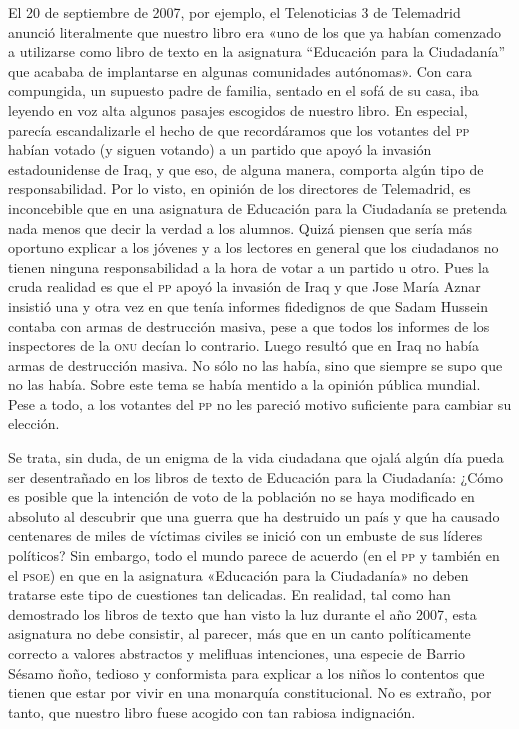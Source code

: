 \documentclass[draft,9pt,letterpaper,twocolumn,openany]{extbook}
\begin{document}
El 20 de septiembre de 2007, por ejemplo, el Telenoticias 3 de Telemadrid
anunció literalmente que nuestro libro era «uno de los que ya habían comenzado
a utilizarse como libro de texto en la asignatura “Educación para la Ciudadanía”
que acababa de implantarse en algunas comunidades autónomas». Con cara 
compungida, un supuesto padre de familia, sentado en el sofá de su casa, iba leyendo
 en voz alta algunos pasajes escogidos de nuestro libro. En especial, parecía 
 escandalizarle el hecho de que recordáramos que los votantes del \textsc{pp} habían votado
(y siguen votando) a un partido que apoyó la invasión estadounidense de Iraq, y
que eso, de alguna manera, comporta algún tipo de responsabilidad. Por lo visto,
en opinión de los directores de Telemadrid, es inconcebible que en una asignatura
 de Educación para la Ciudadanía se pretenda nada menos que decir la verdad
a los alumnos. Quizá piensen que sería más oportuno explicar a los jóvenes y a
los lectores en general que los ciudadanos no tienen ninguna responsabilidad a la
hora de votar a un partido u otro. Pues la cruda realidad es que el \textsc{pp} apoyó la 
invasión de Iraq y que Jose María Aznar insistió una y otra vez en que tenía informes
fidedignos de que Sadam Hussein contaba con armas de destrucción masiva,
pese a que todos los informes de los inspectores de la \textsc{onu} decían lo contrario.
Luego resultó que en Iraq no había armas de destrucción masiva. No sólo no las
había, sino que siempre se supo que no las había. Sobre este tema se había mentido
 a la opinión pública mundial. Pese a todo, a los votantes del \textsc{pp} no les 
 pareció motivo suficiente para cambiar su elección.

Se trata, sin duda, de un enigma de la vida ciudadana que ojalá algún día pueda
ser desentrañado en los libros de texto de Educación para la Ciudadanía: ¿Cómo es
posible que la intención de voto de la población no se haya modificado en absoluto
al descubrir que una guerra que ha destruido un país y que ha causado centenares
de miles de víctimas civiles se inició con un embuste de sus líderes políticos?
Sin embargo, todo el mundo parece de acuerdo (en el \textsc{pp} y también en el \textsc{psoe})
en que en la asignatura «Educación para la Ciudadanía» no deben tratarse este
tipo de cuestiones tan delicadas. En realidad, tal como han demostrado los libros
de texto que han visto la luz durante el año 2007, esta asignatura no debe consistir,
 al parecer, más que en un canto políticamente correcto a valores abstractos y
melifluas intenciones, una especie de Barrio Sésamo ñoño, tedioso y conformista
para explicar a los niños lo contentos que tienen que estar por vivir en una 
monarquía constitucional. No es extraño, por tanto, que nuestro libro fuese acogido con
tan rabiosa indignación.
\end{document}

